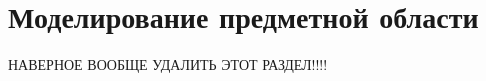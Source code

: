 \section{Моделирование предметной области}
\label{sec:domain}

НАВЕРНОЕ ВООБЩЕ УДАЛИТЬ ЭТОТ РАЗДЕЛ!!!!
